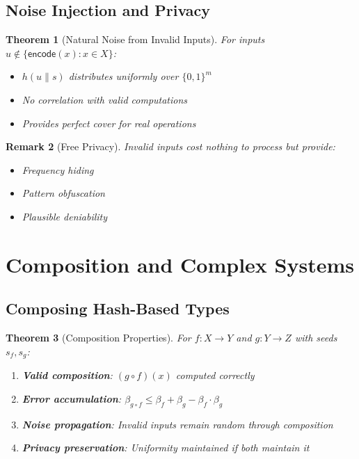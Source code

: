 \documentclass[11pt,final,hidelinks]{article}
\newtheorem{theorem}{Theorem}[section]
\newtheorem{remark}[theorem]{Remark}
\newcommand{\Encode}[1]{\mathsf{encode}(#1)}
\newcommand{\Hash}[1]{h(#1)}
\newcommand{\fnrate}{\beta}
\begin{document}
\subsection{Noise Injection and Privacy}

\begin{theorem}[Natural Noise from Invalid Inputs]
For inputs $u \notin \{\Encode{x} : x \in X\}$:
\begin{itemize}
    \item $\Hash{u \| s}$ distributes uniformly over $\{0,1\}^m$
    \item No correlation with valid computations
    \item Provides perfect cover for real operations
\end{itemize}
\end{theorem}

\begin{remark}[Free Privacy]
Invalid inputs cost nothing to process but provide:
\begin{itemize}
    \item Frequency hiding
    \item Pattern obfuscation
    \item Plausible deniability
\end{itemize}
\end{remark}

\section{Composition and Complex Systems}

\subsection{Composing Hash-Based Types}

\begin{theorem}[Composition Properties]
For $f: X \to Y$ and $g: Y \to Z$ with seeds $s_f, s_g$:
\begin{enumerate}
    \item \textbf{Valid composition}: $(g \circ f)(x)$ computed correctly
    \item \textbf{Error accumulation}: $\fnrate_{g \circ f} \leq \fnrate_f + \fnrate_g - \fnrate_f \cdot \fnrate_g$
    \item \textbf{Noise propagation}: Invalid inputs remain random through composition
    \item \textbf{Privacy preservation}: Uniformity maintained if both maintain it
\end{enumerate}
\end{theorem}
\end{document}
